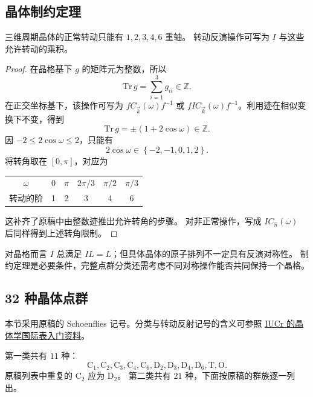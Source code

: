 \subsection{晶体制约定理}
\begin{theorem}
三维周期晶体的正常转动只能有 $1,2,3,4,6$ 重轴。
转动反演操作可写为 $I$ 与这些允许转动的乘积。
\end{theorem}
\begin{proof}
在晶格基下 $g$ 的矩阵元为整数，所以
\begin{equation}
\mathrm{Tr}\,g=\sum_{i=1}^{3}g_{ii}\in\mathbb{Z}.
\end{equation}
在正交坐标基下，该操作可写为 $fC_{\vec k}\left(\omega\right)f^{-1}$ 或
$fIC_{\vec k}\left(\omega\right)f^{-1}$。利用迹在相似变换下不变，得到
\begin{equation}
\mathrm{Tr}\,g=\pm\left(1+2\cos\omega\right)\in\mathbb{Z}.
\end{equation}
因 $-2\leq2\cos\omega\leq2$，只能有
\begin{equation}
2\cos\omega\in\left\{-2,-1,0,1,2\right\}.
\end{equation}
将转角取在 $\left[0,\pi\right]$，对应为
\begin{center}
\begin{tabular}{c|ccccc}
\toprule
$\omega$ & $0$ & $\pi$ & $2\pi/3$ & $\pi/2$ & $\pi/3$\\
转动的阶 & 1 & 2 & 3 & 4 & 6\\\bottomrule
\end{tabular}
\end{center}
这补齐了原稿中由整数迹推出允许转角的步骤。
对非正常操作，写成 $IC_{\hat n}\left(\omega\right)$ 后同样得到上述转角限制。
\end{proof}
对晶格而言 $I$ 总满足 $IL=L$；但具体晶体的原子排列不一定具有反演对称性。
制约定理是必要条件，完整点群分类还需考虑不同对称操作能否共同保持一个晶格。

\subsection{32 种晶体点群}
本节采用原稿的 Schoenflies 记号。分类与转动反射记号的含义可参照
\href{https://journals.iucr.org/j/issues/2010/05/02/kk5061/index.html}{IUCr 的晶体学国际表入门资料}。

第一类共有 $11$ 种：
\begin{equation}
\mathrm{C}_1,\mathrm{C}_2,\mathrm{C}_3,\mathrm{C}_4,\mathrm{C}_6,
\mathrm{D}_2,\mathrm{D}_3,\mathrm{D}_4,\mathrm{D}_6,\mathrm{T},\mathrm{O}.
\end{equation}
原稿列表中重复的 $\mathrm{C}_2$ 应为 $\mathrm{D}_2$。
第二类共有 $21$ 种，下面按原稿的群族逐一列出。


